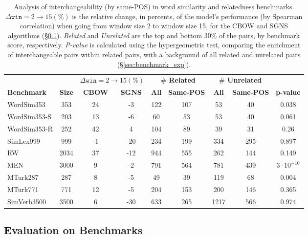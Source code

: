 \documentclass[11pt,a4paper]{article}
\begin{document}
    \begin{table}[th]
    \centering
    \small
    \def\arraystretch{1.125}
    \begin{tabular}{l|c||cc||cc|cc|c}
    && \multicolumn{2}{c||}{\bf $\Delta \mathtt{win}=2\to 15 (\%)$}
    & \multicolumn{2}{c|}{\bf $\#$ Related} & \multicolumn{2}{c|}{\bf $\#$ Unrelated} \\
    \bf Benchmark & \bf Size& \bf CBOW & \bf SGNS
    & \bf All & \bf Same-POS & \bf All & \bf Same-POS & \bf p-value \\
    \hline
    WordSim353 & 353 & 24 & -3 & 122 & 107 & 53 & 40 & 0.038 \\
    WordSim353-S & 203 & 13 & -6 & 60 & 53 & 53 & 40 & 0.061 \\
    WordSim353-R & 252 & 42 & 4 & 104 & 89 & 39 & 31 & 0.26 \\
    SimLex999 & 999 & -1 & -20 & 234 & 199 & 334 & 295 & 0.897 \\
    RW & 2034 & 37 & -12 & 944 & 555 & 262 & 144 & 0.149 \\
    MEN & 3000 & 9 & -2 & 791 & 564 & 781 & 439 & $3\cdot10^{-10}$ \\
    MTurk287 & 287 & 8 & -5 & 49 & 39 & 119 & 68 & 0.004 \\
    MTurk771 & 771 & 12 & -5 & 204 & 153 & 200 & 146 & 0.365 \\
    SimVerb3500 & 3500 & 6 & -30 & 633 & 265 & 1217 & 566 & 0.974
    \end{tabular}
    \caption{Analysis of interchangeability (by same-POS) in
    word similarity and relatedness benchmarks.
    $\Delta \mathtt{win}=2\to 15 (\%)$ is the relative change, in percents,
    of the model's performance (by Spearman correlation) when going from window size 2
    to window size 15, for the CBOW
    and SGNS algorithms (\S\ref{sec:eval_exp}).
    \textit{Related} and \textit{Unrelated} are the top and bottom 30\% of the pairs,
    by benchmark score, respectively.
    \textit{P-value} is calculated using the hypergeometric
    test, comparing the enrichment of interchangeable pairs within related pairs,
    with a background of all related and unrelated pairs (\S\ref{sec:benchmark_exp}).
    \label{tab:benchmark_enrichment}}
    \end{table}
    
    \subsection{Evaluation on Benchmarks}\label{sec:eval_exp}
    
\end{document}
